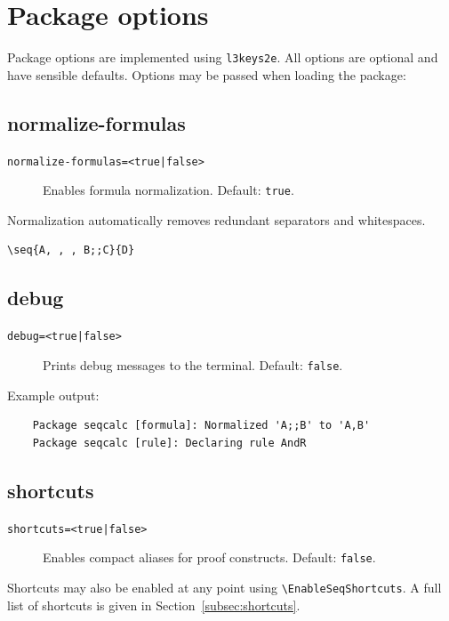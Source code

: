 \documentclass[a4paper,1pt]{article}
\begin{document}
\section{Package options}
\label{sec:options}
Package options are implemented using \texttt{l3keys2e}. All options are optional and have sensible defaults. Options may be passed when loading the package:

\subsection{normalize-formulas}
\begin{description}
    \item[\texttt{normalize-formulas=<true|false>}]
        Enables formula normalization. Default: \texttt{true}.
\end{description}
Normalization automatically removes redundant separators and whitespaces.
\begin{tcolorbox}[
    seqexample,
    title={Normalization example}
]
\begin{lstlisting}
\seq{A, , , B;;C}{D}
\end{lstlisting}
\tcblower
\end{tcolorbox}

\subsection{debug}
\begin{description}
    \item[\texttt{debug=<true|false>}]
        Prints debug messages to the terminal. Default: \texttt{false}.
\end{description}
Example output:
\begin{lstlisting}
    Package seqcalc [formula]: Normalized 'A;;B' to 'A,B'
    Package seqcalc [rule]: Declaring rule AndR
\end{lstlisting}

\subsection{shortcuts}
\begin{description}
    \item[\texttt{shortcuts=<true|false>}]
        Enables compact aliases for proof constructs. Default: \texttt{false}.
    \end{description}
Shortcuts may also be enabled at any point using \texttt{\textbackslash EnableSeqShortcuts}. A full list of shortcuts is given in Section~\ref{subsec:shortcuts}.
\end{document}
